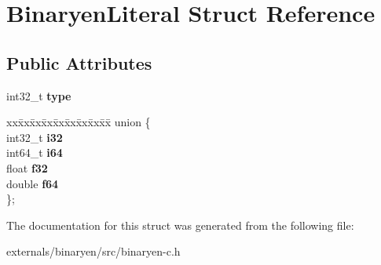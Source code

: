 \hypertarget{struct_binaryen_literal}{}\section{Binaryen\+Literal Struct Reference}
\label{struct_binaryen_literal}
\subsection*{Public Attributes}
\begin{DoxyCompactItemize}
\item 
\mbox{\label{struct_binaryen_literal_acba3e37c2688ea9068b5b25b877a26c0}} 
int32\+\_\+t {\bfseries type}
\item 
\mbox{\label{struct_binaryen_literal_aca213e422b05115bc2c2be688f842539}} 
\begin{tabbing}
xx\=xx\=xx\=xx\=xx\=xx\=xx\=xx\=xx\=\kill
union \{\\
\>int32\_t {\bfseries i32}\\
\>int64\_t {\bfseries i64}\\
\>float {\bfseries f32}\\
\>double {\bfseries f64}\\
\}; \\

\end{tabbing}\end{DoxyCompactItemize}


The documentation for this struct was generated from the following file\+:\begin{DoxyCompactItemize}
\item 
externals/binaryen/src/binaryen-\/c.\+h\end{DoxyCompactItemize}
